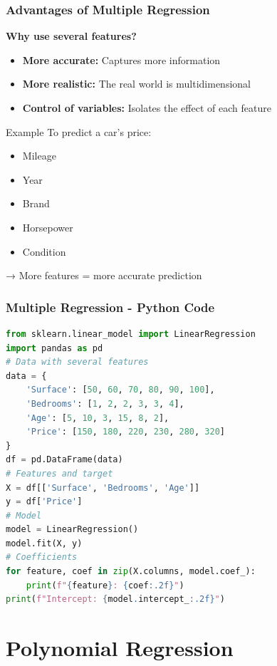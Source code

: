 \documentclass{beamer}
\begin{document}
\begin{frame}
\frametitle{Advantages of Multiple Regression}
\textbf{Why use several features?}

\vspace{1em}
\begin{itemize}
    \item \textbf{More accurate:} Captures more information
    \item \textbf{More realistic:} The real world is multidimensional
    \item \textbf{Control of variables:} Isolates the effect of each feature
\end{itemize}

\vspace{1em}
\begin{exampleblock}{Example}
To predict a car's price:
\begin{itemize}
    \item Mileage
    \item Year
    \item Brand
    \item Horsepower
    \item Condition
\end{itemize}
→ More features = more accurate prediction
\end{exampleblock}
\end{frame}

\begin{frame}[fragile]
\frametitle{Multiple Regression - Python Code}
\begin{lstlisting}[language=Python]
from sklearn.linear_model import LinearRegression
import pandas as pd
# Data with several features
data = {
    'Surface': [50, 60, 70, 80, 90, 100],
    'Bedrooms': [1, 2, 2, 3, 3, 4],
    'Age': [5, 10, 3, 15, 8, 2],
    'Price': [150, 180, 220, 230, 280, 320]
}
df = pd.DataFrame(data)
# Features and target
X = df[['Surface', 'Bedrooms', 'Age']]
y = df['Price']
# Model
model = LinearRegression()
model.fit(X, y)
# Coefficients
for feature, coef in zip(X.columns, model.coef_):
    print(f"{feature}: {coef:.2f}")
print(f"Intercept: {model.intercept_:.2f}")
\end{lstlisting}
\end{frame}

\section{Polynomial Regression}
\end{document}
